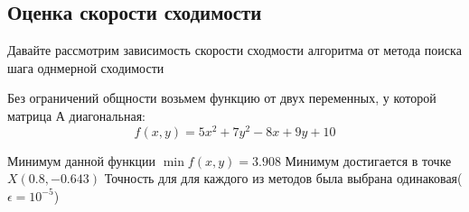 \documentclass[a4paper, 14pt]{article}
\begin{document}
		\subsection*{Оценка скорости сходимости}
		Давайте рассмотрим зависимость скорости сходмости алгоритма от метода поиска шага однмерной сходимости 
		
		Без ограничений общности возьмем функцию от двух переменных, у которой матрица А диагональная:
		\[
		f(x, y) = 5x^2 + 7y^2 - 8x + 9y + 10
		\]
		
		Минимум данной функции $\min f(x, y) = 3.908$ 
		Минимум достигается в точке $X(0.8, -0.643)$
		Точность для для каждого из методов была выбрана одинаковая($\epsilon = 10^{-5}$)
		
		\begin{bchart}[step=2, max=25]
            \medskip
            \medskip
             \medskip
    \end{bchart} 
\end{document}
